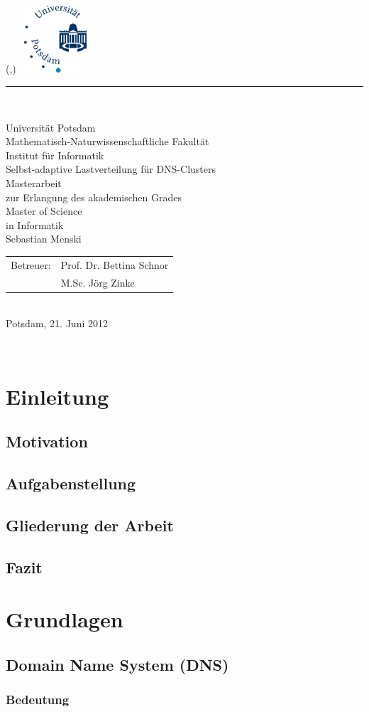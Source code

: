 \documentclass[a4paper, 11pt, toc=bibliography, toc=listof]{scrbook}
\newlength{\TitleMargin}
\newlength{\TitleWidth}
\newcommand{\TitleUni}{Universität Potsdam}
\newcommand{\TitleInstitut}{Mathematisch-Naturwissenschaftliche Fakultät\\Institut für Informatik}
\newcommand{\TitleTitel}{Selbst-adaptive Lastverteilung für DNS-Clusters}
\newcommand{\TitleTyp}{Masterarbeit}
\newcommand{\TitleAutor}{Sebastian Menski}
\newcommand{\TitleBetreuerText}{Betreuer}
\newcommand{\TitleBetreuer}{Prof. Dr. Bettina Schnor\\ &M.Sc. Jörg Zinke}
\newcommand{\TitleAbschlussText}{zur Erlangung des akademischen Grades\\Master of Science\\in Informatik}
\newcommand{\TitleOrt}{Potsdam}
\newcommand{\TitleDatum}{21. Juni 2012}
\renewcommand{\maketitle}{
	\thispagestyle{empty}
	\begin{textblock*}{\TitleWidth}(\TitleMargin,\TitleMargin)
		~\hfill\includegraphics[height=2.5cm]{images/uni-logo}\\[3mm]
		{\color{uniblue}\rule{\TitleWidth}{1mm}}\\[5mm]
		{
			\centering
			\sffamily\Large
			{\LARGE\TitleUni}\\[0.5\baselineskip]
			{\large\TitleInstitut}\\[5\baselineskip]
			{\Huge\TitleTitel}\\[3\baselineskip]

			{\TitleTyp}\\
			\TitleAbschlussText\\[3\baselineskip]

			\TitleAutor\\[6\baselineskip]
			\begin{tabular}{rl}
				\TitleBetreuerText: & \TitleBetreuer
			\end{tabular}\\[3\baselineskip]
			\TitleOrt, \TitleDatum\par
		}
	\end{textblock*}
	~\clearpage
}
\begin{document}
	\frontmatter
	\maketitle{}
	\tableofcontents{}

	\onehalfspacing{}
	\mainmatter
	\pagestyle{scrheadings}

	\chapter{Einleitung} %
	\label{cha:Einleitung}

		\section{Motivation} %
		\label{sec:Motivation}
			

		\section{Aufgabenstellung} %
		\label{sec:Aufgabenstellung}
			

		\section{Gliederung der Arbeit} %
		\label{sec:Gliederung der Arbeit}
			

		\section{Fazit} %
		\label{sec:Fazit}
		


	\chapter{Grundlagen} %
	\label{cha:Grundlagen}

		\section{Domain Name System (DNS)} %
		\label{sec:Domain Name System (DNS)}

			\subsection{Bedeutung} %
			\label{sub:Bedeutung}
			
\end{document}
